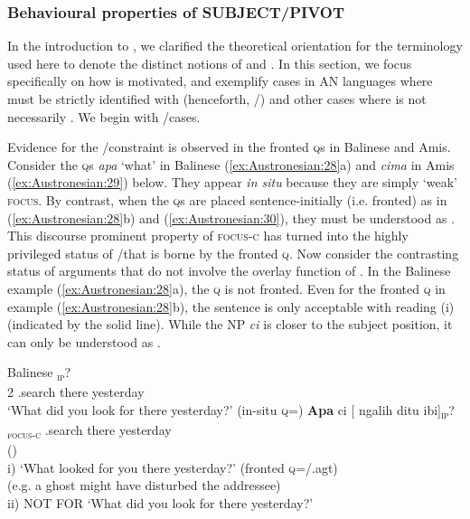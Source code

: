 \documentclass[output=paper,chinesefont]{../langscibook}
\begin{document}
\newpage
\subsubsection{Behavioural properties of SUBJECT/PIVOT}
\label{sec:Austronesian:4.1.2}

In the introduction to , we clarified the theoretical orientation for the terminology used here to denote the distinct notions of \SUBJ and \PIVOT. In this section, we focus specifically on how \PIVOT is motivated, and exemplify cases in AN languages where \PIVOT must be strictly identified with \SUBJ (henceforth, \SUBJ/\PIVOT) and other cases where \PIVOT is not necessarily \SUBJ. We begin with \SUBJ/\PIVOT cases.

Evidence for the \SUBJ/\PIVOT constraint is observed in the fronted \textsc{q}s in Balinese and Amis. Consider the \textsc{q}s \emph{apa} `what' in Balinese (\ref{ex:Austronesian:28}a) and \emph{cima} in Amis (\ref{ex:Austronesian:29}) below. They appear \emph{in situ} because they are simply `weak' \textsc{focus}. By contrast, when the \textsc{q}s are placed sentence-initially (i.e. fronted) as in (\ref{ex:Austronesian:28}b) and (\ref{ex:Austronesian:30}), they must be understood as \SUBJ. This discourse prominent property of \textsc{focus-c} has turned \SUBJ into the highly privileged status of \SUBJ/\PIVOT that is borne by the fronted \textsc{q}. Now consider the contrasting status of arguments that do not involve the overlay function of \PIVOT. In the Balinese example (\ref{ex:Austronesian:28}a), the \textsc{q} is not fronted. Even for the fronted \textsc{q} in example (\ref{ex:Austronesian:28}b), the sentence is only acceptable with reading (i) (indicated by the solid line). While the NP \emph{ci} is closer to the subject position, it can only be understood as \OBJ.

\ea\label{ex:Austronesian:28} Balinese \citep[27]{arka2003}
\ea{}\textsubscript{\textsc{ip}}? \\
 \phantom{[}2 \AV.search {\OBJ} there yesterday\\
\glt`What did you look for there yesterday?' (in-situ \textsc{q}=)
\ex\glll
 \textbf{Apa} ci [ {\GAP}    ngalih  {\GAP}  ditu ibi]\textsubscript{\textsc{ip}}? \\
 [\rnode{w}{what}]\textsubscript{\textsc{focus-c}}{\vrule height 1.5ex depth 2ex width 0pt}  {} {} \AV.search {} there yesterday\\
 (\PIVOT)   \\
\glt i) `What looked for you there yesterday?' (fronted \textsc{q}=\SUBJ/\PIVOT.agt) \\
 (e.g. a ghost might have disturbed the addressee)\\
ii) NOT FOR `What did you look for there yesterday?'
\z\z
\end{document}
